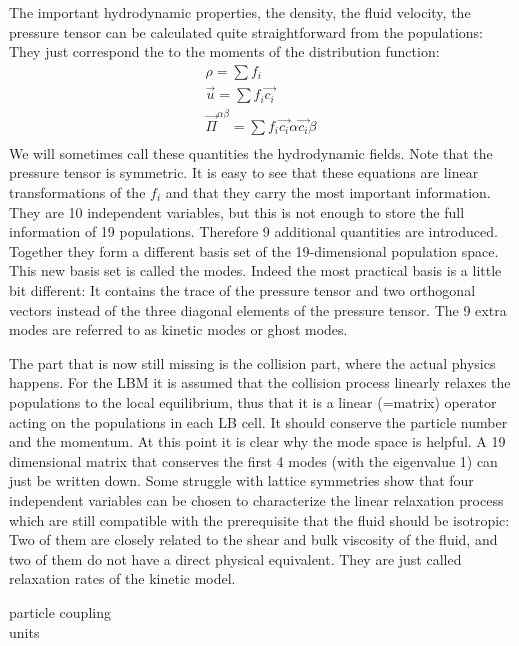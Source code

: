The important hydrodynamic properties, the density, the fluid velocity,
the pressure tensor can be calculated quite straightforward from
the populations: They just correspond the to the moments
of the distribution function: 
\begin{align}
  \rho = \sum f_i \\
  \vec{u} = \sum f_i \vec{c_i} \\
  \vec{\Pi}^{\alpha \beta} = \sum f_i \vec{c_i}{\alpha}\vec{c_i}{\beta} \\
  \label{eq:fields}
\end{align}
We will sometimes call these quantities the hydrodynamic fields.
Note that the pressure tensor is symmetric.
It is easy to see that these equations are linear transformations
of the $f_i$ and that they carry the most important information. They
are 10 independent variables, but this is not enough to store the
full information of 19 populations. Therefore 9 additional quantities
are introduced. Together they form a different basis set of the
19-dimensional population space. This new basis set is called
the modes. Indeed the most practical basis is a little bit different:
It contains the trace of the pressure tensor and two orthogonal 
vectors instead of the three diagonal elements of the pressure 
tensor. The 9 extra modes are referred to as kinetic modes or
ghost modes.

The part that is now still missing is the collision part, where
the actual physics happens. For the LBM it is assumed that
the collision process linearly relaxes the populations to the local
equilibrium, thus that it is a linear (=matrix) operator 
acting on the populations in each LB cell. It should conserve 
the particle number and the momentum. At this point it is clear
why the mode space is helpful. A 19 dimensional matrix that
conserves the first 4 modes (with the eigenvalue 1) can just be written
down. Some struggle with lattice symmetries show that four independent
variables can be chosen to characterize the linear relaxation
process which are still compatible with the prerequisite that
the fluid should be isotropic: Two of them are closely related to 
the shear and bulk viscosity of the fluid, and two of them
do not have a direct physical equivalent. They are just called
relaxation rates of the kinetic model.


particle coupling \\

units \\


